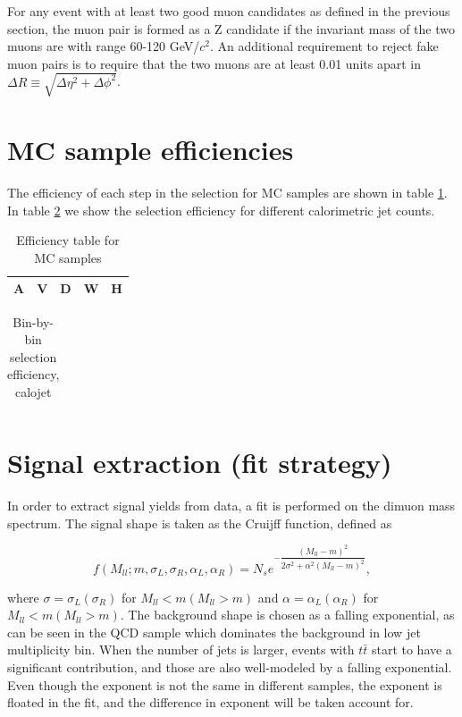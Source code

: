 \documentclass[10pt,a4paper,onecolumn]{article}
\begin{document}
For any event with at least two good muon candidates as defined in the previous section, the muon pair is formed as a Z candidate if
the invariant mass of the two muons are with range 60-120 GeV/$c^2$.  An additional requirement to reject fake muon pairs is to require
that the two muons are at least 0.01 units apart in $\Delta R \equiv \sqrt{\Delta\eta^2 + \Delta\phi^2}$.

\section{MC sample efficiencies}

The efficiency of each step in the selection for MC samples are shown in table \ref{Table_MCSelectionEfficiency}.
In table \ref{Table_MCJetWiseSelectionEfficiencyCaloJet} we show the selection efficiency for different calorimetric jet counts.

\begin{table}
   \caption{Efficiency table for MC samples}
   \centering
   \begin{tabular}{|c|c|c|c|c|}
      \hline
      A & V & D & W & H \\\hline
   \end{tabular}
   \label{Table_MCSelectionEfficiency}
\end{table}

\begin{table}
   \caption{Bin-by-bin selection efficiency, calojet}
   \centering
   \begin{tabular}{|c|c|c|}
      \hline
   \end{tabular}
   \label{Table_MCJetWiseSelectionEfficiencyCaloJet}
\end{table}

\section{Signal extraction (fit strategy)}

In order to extract signal yields from data, a fit is performed on the dimuon mass spectrum.
The signal shape is taken as the Cruijff function, defined as

\begin{equation}
f(M_{ll}; m, \sigma_L, \sigma_R, \alpha_L, \alpha_R) = N_s e^{-\dfrac{(M_{ll} - m)^2}{2 \sigma^2 + \alpha^2 (M_{ll} - m)^2}},\nonumber
\end{equation}

where $\sigma = \sigma_L (\sigma_R)$ for $M_{ll} < m (M_{ll} > m)$ and $\alpha = \alpha_L (\alpha_R)$ for $M_{ll} < m (M_{ll} > m)$.
The background shape is chosen as a falling exponential, as can be seen in the QCD sample which dominates the background in low
jet multiplicity bin.  When the number of jets is larger, events with $t\bar{t}$ start to have a significant contribution, and those are
also well-modeled by a falling exponential.
Even though the exponent is not the same in different samples, the exponent is floated in the fit, and the difference in exponent will be taken account for.
\end{document}
